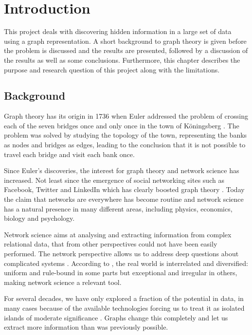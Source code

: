 \chapter{Introduction}
This project deals with discovering hidden information in a large set of data using a graph representation. A short background to graph theory is given before the problem is discussed and the results are presented, followed by a discussion of the results as well as some conclusions. Furthermore, this chapter describes the purpose and research question of this project along with the limitations. 

\section{Background}
Graph theory has its origin in 1736 when Euler addressed the problem of crossing each of the seven bridges once and only once in the town of Köningsberg \cite{fouss2016algorithms}. The problem was solved by studying the topology of the town, representing the banks as nodes and bridges as edges, leading to the conclusion that it is not possible to travel each bridge and visit each bank once.

Since Euler's discoveries, the interest for graph theory and network science has increased. Not least since the emergence of social networking sites such as Facebook, Twitter and LinkedIn which has clearly boosted graph theory \cite{fouss2016algorithms,barabasi2016network}. Today the claim that networks are everywhere has become routine \cite{brandes2013} and network science has a natural presence in many different areas, including physics, economics, biology and psychology.

Network science aims at analysing and extracting information from complex relational data, that from other perspectives could not have been easily performed. The network perspective allows us to address deep questions about complicated systems \cite{brandes2013}. According to \citet{robinson2013}, the real world is interrelated and diversified: uniform and rule-bound in some parts but exceptional and irregular in others, making network science a relevant tool.

For several decades, we have only explored a fraction of the potential in data, in many cases because of the available technologies forcing us to treat it as isolated islands of moderate significance \cite{robinson2013}. Graphs change this completely and let us extract more information than was previously possible.


